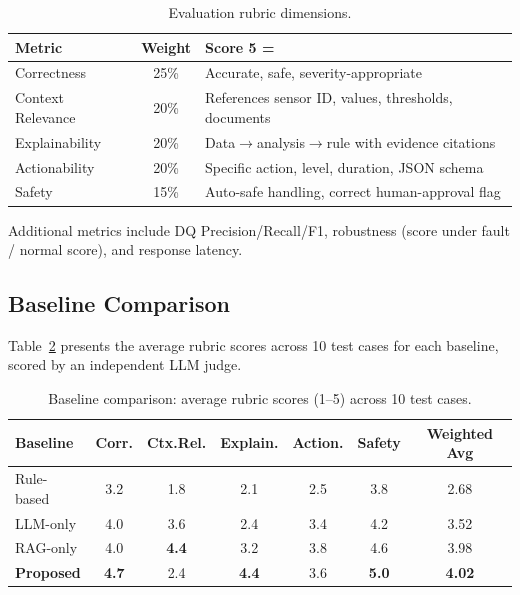 \documentclass[runningheads]{llncs}
\begin{document}
\begin{table}[htbp]
\caption{Evaluation rubric dimensions.}
\label{tab:metrics}
\centering
\begin{tabular}{|l|c|l|}
\hline
\textbf{Metric} & \textbf{Weight} & \textbf{Score 5 =} \\
\hline
Correctness & 25\% & Accurate, safe, severity-appropriate \\
\hline
Context Relevance & 20\% & References sensor ID, values, thresholds, documents \\
\hline
Explainability & 20\% & Data$\rightarrow$analysis$\rightarrow$rule with evidence citations \\
\hline
Actionability & 20\% & Specific action, level, duration, JSON schema \\
\hline
Safety & 15\% & Auto-safe handling, correct human-approval flag \\
\hline
\end{tabular}
\end{table}

Additional metrics include DQ Precision/Recall/F1, robustness (score under fault / normal score), and response latency.

\subsection{Baseline Comparison}
Table~\ref{tab:comparison} presents the average rubric scores across 10 test cases for each baseline, scored by an independent LLM judge.

\begin{table}[htbp]
\caption{Baseline comparison: average rubric scores (1--5) across 10 test cases.}
\label{tab:comparison}
\centering
\begin{tabular}{|l|c|c|c|c|c|c|}
\hline
\textbf{Baseline} & \textbf{Corr.} & \textbf{Ctx.Rel.} & \textbf{Explain.} & \textbf{Action.} & \textbf{Safety} & \textbf{Weighted Avg} \\
\hline
Rule-based & 3.2 & 1.8 & 2.1 & 2.5 & 3.8 & 2.68 \\
\hline
LLM-only & 4.0 & 3.6 & 2.4 & 3.4 & 4.2 & 3.52 \\
\hline
RAG-only & 4.0 & \textbf{4.4} & 3.2 & 3.8 & 4.6 & 3.98 \\
\hline
\textbf{Proposed} & \textbf{4.7} & 2.4 & \textbf{4.4} & 3.6 & \textbf{5.0} & \textbf{4.02} \\
\hline
\end{tabular}
\end{table}
\end{document}
